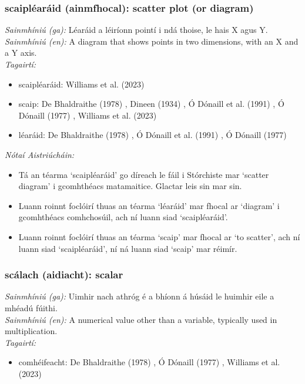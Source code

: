 \subsubsection*{scaipléaráid (ainmfhocal): scatter plot (or diagram)}
 \noindent \textit{Sainmhíniú (ga):} Léaráid a léiríonn pointí i ndá thoise, le hais X agus Y.
\\
 \noindent \textit{Sainmhíniú (en):} A diagram that shows points in two dimensions, with an X and a Y axis.
\\
 \noindent \textit{Tagairtí:}
\begin{itemize}
	\item scaipléaráid: Williams et al. (2023) \cite{storchiste}
	\item scaip: De Bhaldraithe (1978) \cite{de-bhaldraithe}, Dineen (1934) \cite{dineen}, Ó Dónaill et al. (1991) \cite{focloir-beag}, Ó Dónaill (1977) \cite{odonaill}, Williams et al. (2023) \cite{storchiste}
	\item léaráid: De Bhaldraithe (1978) \cite{de-bhaldraithe}, Ó Dónaill et al. (1991) \cite{focloir-beag}, Ó Dónaill (1977) \cite{odonaill}
\end{itemize}

 \noindent \textit{Nótaí Aistriúcháin:}
\begin{itemize}
	\item Tá an téarma `scaipléaráid' go díreach le fáil i Stórchiste mar `scatter diagram' i gcomhthéacs matamaitice. Glactar leis sin mar sin.
	\item Luann roinnt foclóirí thuas an téarma `léaráid' mar fhocal ar `diagram' i gcomhthéacs comhchosúil, ach ní luann siad `scaipléaráid'.
	\item Luann roinnt foclóirí thuas an téarma `scaip' mar fhocal ar `to scatter', ach ní luann siad `scaipléaráid', ní ná luann siad `scaip' mar réimír.
\end{itemize}


\subsubsection*{scálach (aidiacht): scalar}
 \noindent \textit{Sainmhíniú (ga):} Uimhir nach athróg é a bhíonn á húsáid le huimhir eile a mhéadú fúithi.
\\
 \noindent \textit{Sainmhíniú (en):} A numerical value other than a variable, typically used in multiplication.
\\
 \noindent \textit{Tagairtí:}
\begin{itemize}
	\item comhéifeacht: De Bhaldraithe (1978) \cite{de-bhaldraithe}, Ó Dónaill (1977) \cite{odonaill}, Williams et al. (2023) \cite{storchiste}
\end{itemize}

